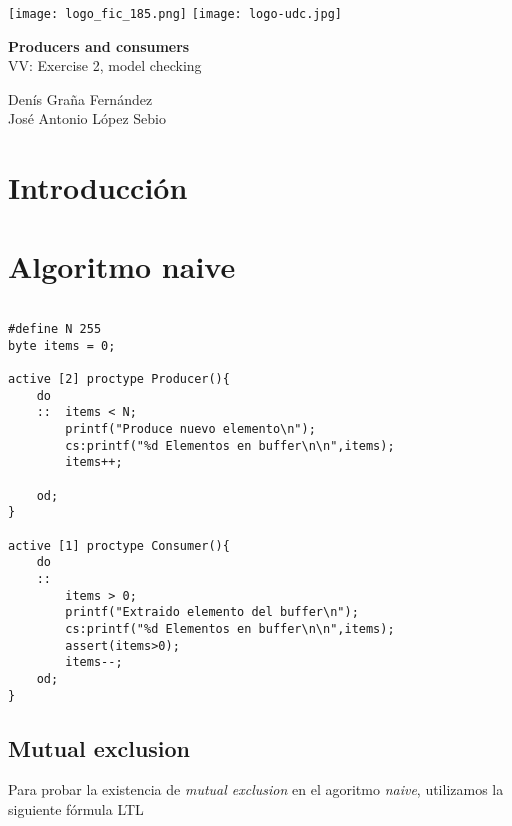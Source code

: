 \documentclass[a4paper,12pt]{article}
\begin{document}
\vspace{2cm}
\texttt{[image: logo\_fic\_185.png]}\hspace{5cm} 
\texttt{[image: logo-udc.jpg]}\\
[2cm]
\begin{center}
  \Large \textbf{Producers and consumers}\\ VV: Exercise 2, model checking
\end{center}


\vspace{10cm}
\begin{flushright}
Denís Graña Fernández \\
José Antonio López Sebio \\
[2cm]
\end{flushright}

\newpage
\tableofcontents
\newpage

\section{Introducción}


\section{Algoritmo naive}

\lstset{
	language=C,
	tabsize=2,  
	showspaces=false,     
	breakatwhitespace=false,
	showstringspaces=false
	}          %

\begin{lstlisting}[frame=single]  % Start your code-block

#define N 255
byte items = 0;

active [2] proctype Producer(){
	do
	::	items < N;
		printf("Produce nuevo elemento\n");
		cs:printf("%d Elementos en buffer\n\n",items);
		items++;
		
	od;
}

active [1] proctype Consumer(){
	do
	::	 
		items > 0;
		printf("Extraido elemento del buffer\n");
		cs:printf("%d Elementos en buffer\n\n",items);
		assert(items>0);
		items--;
	od;
}
\end{lstlisting}

\subsection{Mutual exclusion}
Para probar la existencia de \textit{mutual exclusion} en el agoritmo \textit{naive}, utilizamos la siguiente fórmula LTL
\end{document}
